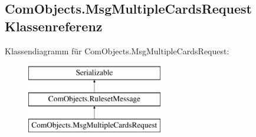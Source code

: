 \hypertarget{a00062}{\subsection{Com\-Objects.\-Msg\-Multiple\-Cards\-Request Klassenreferenz}
\label{a00062}
}
Klassendiagramm für Com\-Objects.\-Msg\-Multiple\-Cards\-Request\-:\begin{figure}[H]
\begin{center}
\leavevmode
\includegraphics[height=3.000000cm]{a00062}
\end{center}
\end{figure}
